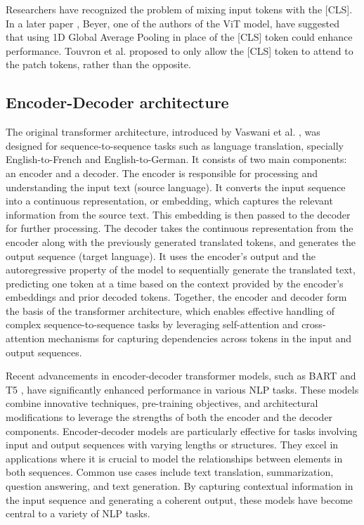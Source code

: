 Researchers have recognized the problem of mixing input tokens with the [CLS]. In a later paper \cite{beyer2022better}, Beyer, one of the authors of the ViT model, have suggested that using 1D Global Average Pooling in place of the [CLS] token could enhance performance.
Touvron et al. \cite{touvron2021going} proposed to only allow the [CLS] token to attend to the patch tokens, rather than the opposite.

\subsection{Encoder-Decoder architecture}
The original transformer architecture, introduced by Vaswani et al. \cite{vaswani2017attention}, was designed for sequence-to-sequence tasks such as language translation, specially English-to-French and English-to-German.
It consists of two main components: an encoder and a decoder.
The encoder is responsible for processing and understanding the input text (source language). It converts the input sequence into a continuous representation, or embedding, which captures the relevant information from the source text. This embedding is then passed to the decoder for further processing.
The decoder takes the continuous representation from the encoder along with the previously generated translated tokens, and generates the output sequence (target language). It uses the encoder's output and the autoregressive property of the model to sequentially generate the translated text, predicting one token at a time based on the context provided by the encoder's embeddings and prior decoded tokens.
Together, the encoder and decoder form the basis of the transformer architecture, which enables effective handling of complex sequence-to-sequence tasks by leveraging self-attention and cross-attention mechanisms for capturing dependencies across tokens in the input and output sequences.

Recent advancements in encoder-decoder transformer models, such as BART \cite{lewis2020bart} and T5 \cite{raffel2020exploring,tay2023ul}, have significantly enhanced performance in various NLP tasks. These models combine innovative techniques, pre-training objectives, and architectural modifications to leverage the strengths of both the encoder and the decoder components.
Encoder-decoder models are particularly effective for tasks involving input and output sequences with varying lengths or structures. They excel in applications where it is crucial to model the relationships between elements in both sequences. Common use cases include text translation, summarization, question answering, and text generation. By capturing contextual information in the input sequence and generating a coherent output, these models have become central to a variety of NLP tasks.

